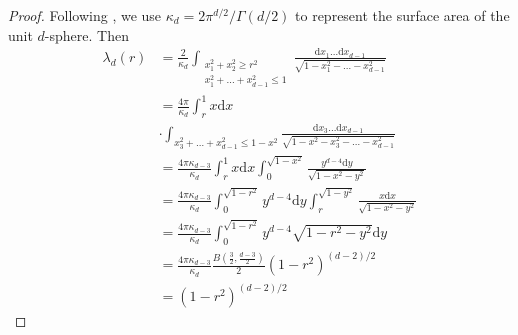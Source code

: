 \documentclass[conference,a4paper]{IEEEtran}
\def\dd{\mathrm{d}}
\begin{document}
\begin{proof}
     Following \cite{dwyer1991convex}, we use $\kappa_d = 2\pi^{d/2}/\Gamma(d/2)$
     to represent the surface area of the unit $d$-sphere. Then
     \begin{align*}
          \lambda_d(r) &=\frac{2}{\kappa_d} 
          \int_{\substack{x_1^2+x_2^2\geq r^2\\
          x_1^2+\dots+x_{d-1}^2\leq 1 }} 
          \frac{\dd x_1 \dots \dd x_{d-1}}{\sqrt{1-x_1^2-\dots -x_{d-1}^2}} \\
      &= \frac{4\pi}{\kappa_d} \int_r^1 x\dd x \\
      &\cdot\int_{x_3^2+\dots + x_{d-1}^2 \leq 1-x^2} \frac{\dd x_3\dots \dd x_{d-1}}
      {\sqrt{1-x^2-x_3^2-\dots -x_{d-1}^2}} \\
      &=\frac{4\pi \kappa_{d-3}}{\kappa_d} \int_r^1 x\dd x \int_0^{\sqrt{1-x^2}} \frac{y^{d-4}\dd y}{\sqrt{1-x^2-y^2}}\\
      &=\frac{4\pi \kappa_{d-3}}{\kappa_d} \int_0^{\sqrt{1-r^2}} y^{d-4}\dd y \int_r^{\sqrt{1-y^2}} \frac{x\dd x}{\sqrt{1-x^2-y^2}}\\
      &=\frac{4\pi \kappa_{d-3}}{\kappa_d} \int_0^{\sqrt{1-r^2}} y^{d-4}\sqrt{1-r^2-y^2} \dd y\\
      &=\frac{4\pi \kappa_{d-3}}{\kappa_d}  \frac{B(\frac{3}{2 }, \frac{d-3}{2})}{2}(1-r^2)^{(d-2)/2}\\
      &=  (1-r^2)^{(d-2)/2}
      \end{align*}
\end{proof}
\end{document}
